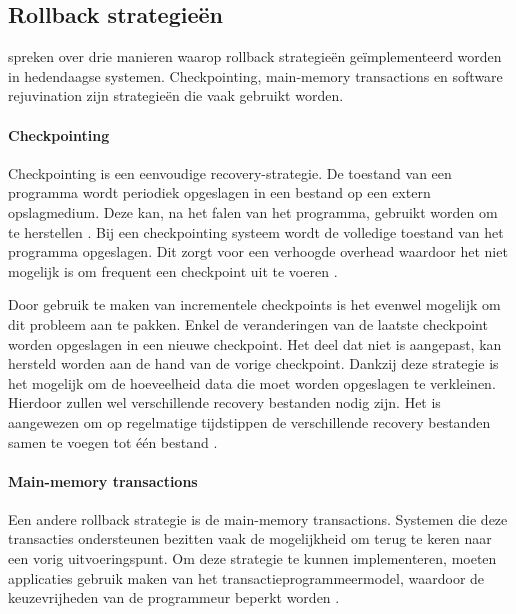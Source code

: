 \subsection{Rollback strategieën}
\citet{srinivasan2004flashback} spreken over drie manieren waarop rollback strategieën geïmplementeerd worden in hedendaagse systemen.
Checkpointing, main-memory transactions en software rejuvination zijn strategieën die vaak gebruikt worden.

\paragraph{Checkpointing}
Checkpointing is een eenvoudige recovery-strategie.
De toestand van een programma wordt periodiek opgeslagen in een bestand op een extern opslagmedium.
Deze kan, na het falen van het programma, gebruikt worden om te herstellen \citep{plank1994libckpt}.
Bij een checkpointing systeem wordt de volledige toestand van het programma opgeslagen.
Dit zorgt voor een verhoogde overhead waardoor het niet mogelijk is om frequent een checkpoint uit te voeren \citep{srinivasan2004flashback}.

Door gebruik te maken van incrementele checkpoints is het evenwel mogelijk om dit probleem aan te pakken.
Enkel de veranderingen van de laatste checkpoint worden opgeslagen in een nieuwe checkpoint.
Het deel dat niet is aangepast, kan hersteld worden aan de hand van de vorige checkpoint.
Dankzij deze strategie is het mogelijk om de hoeveelheid data die moet worden opgeslagen te verkleinen.
Hierdoor zullen wel verschillende recovery bestanden nodig zijn.
Het is aangewezen om op regelmatige tijdstippen de verschillende recovery bestanden samen te voegen tot één bestand \citep{plank1994libckpt, elnozahy2002survey}.

\paragraph{Main-memory transactions}
Een andere rollback strategie is de main-memory transactions.
Systemen die deze transacties ondersteunen bezitten vaak de mogelijkheid om terug te keren naar een vorig uitvoeringspunt.
Om deze strategie te kunnen implementeren, moeten applicaties gebruik maken van het transactieprogrammeermodel, waardoor de keuzevrijheden van de programmeur beperkt worden \citep{srinivasan2004flashback}.

